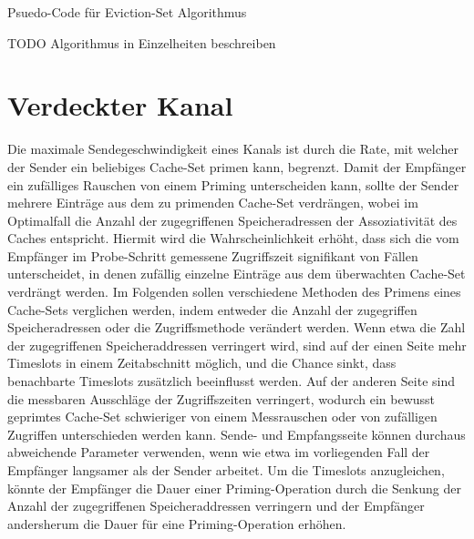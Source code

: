 \begin{algorithm}[h]
\DontPrintSemicolon
\caption{Psuedo-Code für Eviction-Set Algorithmus}
\label{alg:evictionSetOverview}

\end{algorithm}

\newtextend

TODO Algorithmus in Einzelheiten beschreiben


\section{Verdeckter Kanal}

Die maximale Sendegeschwindigkeit eines Kanals ist durch die Rate, mit welcher der Sender ein beliebiges Cache-Set primen kann, begrenzt.
Damit der Empfänger ein zufälliges Rauschen von einem Priming unterscheiden kann, sollte der Sender mehrere Einträge aus dem zu primenden Cache-Set verdrängen, wobei im Optimalfall die Anzahl der zugegriffenen Speicheradressen der Assoziativität des Caches entspricht.
Hiermit wird die Wahrscheinlichkeit erhöht, dass sich die vom Empfänger im Probe-Schritt gemessene Zugriffszeit signifikant von Fällen unterscheidet, in denen zufällig einzelne Einträge aus dem überwachten Cache-Set verdrängt werden. 
Im Folgenden sollen verschiedene Methoden des Primens eines Cache-Sets verglichen werden, indem entweder die Anzahl der zugegriffen Speicheradressen oder die Zugriffsmethode verändert werden.
Wenn etwa die Zahl der zugegriffenen Speicheraddressen verringert wird, sind auf der einen Seite mehr Timeslots in einem Zeitabschnitt möglich, und die Chance sinkt, dass benachbarte Timeslots zusätzlich beeinflusst werden. Auf der anderen Seite sind die messbaren Ausschläge der Zugriffszeiten verringert, wodurch ein bewusst geprimtes Cache-Set schwieriger von einem Messrauschen oder von zufälligen Zugriffen unterschieden werden kann.
Sende- und Empfangsseite können durchaus abweichende Parameter verwenden, wenn wie etwa im vorliegenden Fall der Empfänger langsamer als der Sender arbeitet. Um die Timeslots anzugleichen, könnte der Empfänger die Dauer einer Priming-Operation durch die Senkung der Anzahl der zugegriffenen Speicheraddressen verringern und der Empfänger andersherum die Dauer für eine Priming-Operation erhöhen. 

